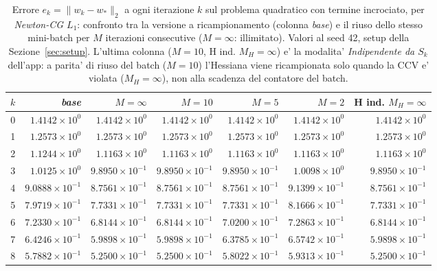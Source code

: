 \begin{table}[H]
\centering
\footnotesize
\renewcommand{\arraystretch}{0.85}
\setlength{\tabcolsep}{2pt}
\caption{Errore $e_k=\|w_k-w_*\|_2$ a ogni iterazione $k$ sul problema quadratico con termine incrociato, per \emph{Newton-CG $L_1$}: confronto tra la versione a ricampionamento (colonna \emph{base}) e il riuso dello stesso mini-batch per $M$ iterazioni consecutive ($M=\infty$: illimitato). Valori al seed 42, setup della Sezione~\ref{sec:setup}. L'ultima colonna ($M{=}10$, H ind. $M_H{=}\infty$) e' la modalita' \emph{Indipendente da $S_k$} dell'app: a parita' di riuso del batch ($M=10$) l'Hessiana viene ricampionata solo quando la CCV e' violata ($M_H=\infty$), non alla scadenza del contatore del batch.}
\label{tab:riuso_offdiag_l1}
\begin{tabular}{@{}rrrrrrr@{}}
\toprule
$k$ & \emph{base} & $M{=}\infty$ & $M{=}10$ & $M{=}5$ & $M{=}2$ & H ind. $M_H{=}\infty$\\
\midrule
0 & $1.4142\times10^{0}$ & $1.4142\times10^{0}$ & $1.4142\times10^{0}$ & $1.4142\times10^{0}$ & $1.4142\times10^{0}$ & $1.4142\times10^{0}$\\
1 & $1.2573\times10^{0}$ & $1.2573\times10^{0}$ & $1.2573\times10^{0}$ & $1.2573\times10^{0}$ & $1.2573\times10^{0}$ & $1.2573\times10^{0}$\\
2 & $1.1244\times10^{0}$ & $1.1163\times10^{0}$ & $1.1163\times10^{0}$ & $1.1163\times10^{0}$ & $1.1163\times10^{0}$ & $1.1163\times10^{0}$\\
3 & $1.0125\times10^{0}$ & $9.8950\times10^{-1}$ & $9.8950\times10^{-1}$ & $9.8950\times10^{-1}$ & $1.0098\times10^{0}$ & $9.8950\times10^{-1}$\\
4 & $9.0888\times10^{-1}$ & $8.7561\times10^{-1}$ & $8.7561\times10^{-1}$ & $8.7561\times10^{-1}$ & $9.1399\times10^{-1}$ & $8.7561\times10^{-1}$\\
5 & $7.9719\times10^{-1}$ & $7.7331\times10^{-1}$ & $7.7331\times10^{-1}$ & $7.7331\times10^{-1}$ & $8.1666\times10^{-1}$ & $7.7331\times10^{-1}$\\
6 & $7.2330\times10^{-1}$ & $6.8144\times10^{-1}$ & $6.8144\times10^{-1}$ & $7.0200\times10^{-1}$ & $7.2863\times10^{-1}$ & $6.8144\times10^{-1}$\\
7 & $6.4246\times10^{-1}$ & $5.9898\times10^{-1}$ & $5.9898\times10^{-1}$ & $6.3785\times10^{-1}$ & $6.5742\times10^{-1}$ & $5.9898\times10^{-1}$\\
8 & $5.7882\times10^{-1}$ & $5.2500\times10^{-1}$ & $5.2500\times10^{-1}$ & $5.8022\times10^{-1}$ & $5.9313\times10^{-1}$ & $5.2500\times10^{-1}$\\

\end{tabular}
\end{table}
